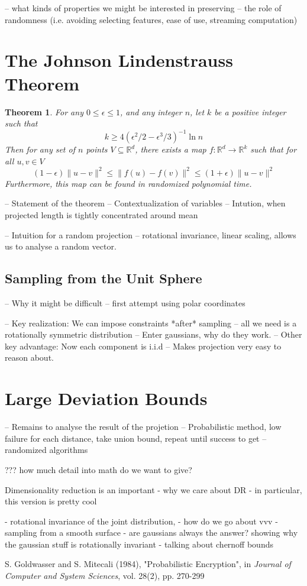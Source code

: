 \documentclass[11pt]{article}
\newcommand{\ir}[1]{\textnormal{\sc#1}}
\newcommand{\arr}{\rightarrow}
\newcommand{\R}{\mathbb{R}}
\newtheorem{Thm}{Theorem}
\begin{document}
-- what kinds of properties we might be interested in preserving
-- the role of randomness (i.e. avoiding selecting features, ease of use, streaming computation)

\section{The Johnson Lindenstrauss Theorem}
\begin{Thm}
    For any $0 \leq \epsilon \leq 1$, and any integer $n$, let $k$ be a positive integer such that
    \[ k \geq 4(\epsilon^2/2 - \epsilon^3/3)^{-1} \ln n \]
    Then for any set of $n$ points $V \subseteq \R^d$, there exists a map $f:\R^d \arr \R^k$ such that for all $u, v \in V$
    \[(1-\epsilon)\|u - v\|^2 \leq \| f(u) - f(v) \|^2 \leq (1+\epsilon) \| u - v \|^2 \]
    Furthermore, this map can be found in randomized polynomial time.
\end{Thm}
-- Statement of the theorem
-- Contextualization of variables
-- Intution, when projected length is tightly concentrated around mean

-- Intuition for a random projection
-- rotational invariance, linear scaling, allows us to analyse a random vector.

\subsection{Sampling from the Unit Sphere}
-- Why it might be difficult
-- first attempt using polar coordinates

-- Key realization: We can impose constraints *after* sampling
   -- all we need is a rotationally symmetric distribution
-- Enter gaussians, why do they work.
-- Other key advantage: Now each component is i.i.d
    -- Makes projection very easy to reason about.

\section{Large Deviation Bounds}
-- Remains to analyse the result of the projetion
-- Probabilistic method, low failure for each distance, take union bound, repeat until success to get
-- randomized algorithms

??? how much detail into math do we want to give?



Dimensionality reduction is an important 
- why we care about DR
- in particular, this version is pretty cool

- rotational invariance of the joint distribution, 
- how do we go about vvv 
- sampling from a smooth surface
- are gaussians always the answer?
showing why the gaussian stuff is rotationally invariant
- talking about chernoff bounds

\begin{thebibliography}{1}
     \ir{S. Goldwasser and S. Mitecali} (1984), "Probabilistic Encryption", in \textit{Journal of Computer and System Sciences}, vol. 28(2), pp. 270-299
        
\end{thebibliography}
\end{document}
